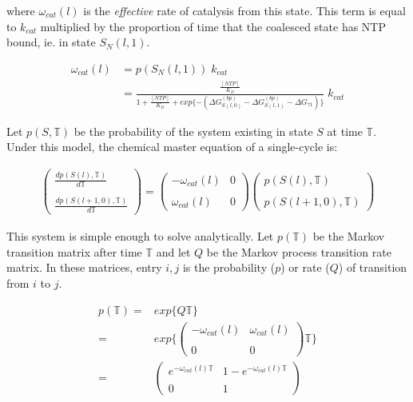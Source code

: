 \documentclass[10pt,letterpaper]{article}
\begin{document}
where $\omega_{cat}(l)$ is the \textit{effective} rate of catalysis from this state. This term is equal to $k_{cat}$ multiplied by the proportion of time that the coalesced state has NTP bound, ie. in state $S_N(l,1)$.


\begin{align}
    \omega_{cat}(l) &= p( S_N(l,1) ) \; k_{cat} \\
    &= \frac{ \frac{[NTP]}{K_D} }{ 1 + \frac{[NTP]}{K_D} + exp\{ -(\Delta G^{(bp)}_{S(l,0)} -  \Delta G^{(bp)}_{S(l,1)} - \Delta G _{\tau 1} ) \} } \; k_{cat}
\end{align}


Let $p(S, \mathbb{T})$ be the probability of the system existing in state $S$ at time $\mathbb{T}$. Under this model, the chemical master equation of a single-cycle is:


\begin{eqnarray}
    \begin{pmatrix}
        \frac{d p( S(l), \mathbb{T} )}{d\mathbb{T}} \\ \\
        \frac{d p( S(l+1,0), \mathbb{T} )}{d\mathbb{T}}
    \end{pmatrix} =
    \begin{pmatrix}
        -\omega_{cat}(l) & 0 \\ \\
        \omega_{cat}(l) & 0
    \end{pmatrix}
    \begin{pmatrix}
        p( S(l), \mathbb{T} ) \\ \\
        p( S(l+1,0), \mathbb{T} )
    \end{pmatrix}
\end{eqnarray}



This system is simple enough to solve analytically. Let $p(\mathbb{T})$ be the Markov transition matrix after time $\mathbb{T}$ and let $Q$ be the Markov process transition rate matrix. In these matrices, entry $i,j$ is the probability ($p$) or rate ($Q$) of transition from $i$ to $j$.


\begin{align}
    p(\mathbb{T}) =& exp\{ Q\mathbb{T} \} \\
    =& exp \Bigg\{
     \begin{pmatrix}
        -\omega_{cat}(l) & \omega_{cat}(l) \\ \\
        0 & 0
    \end{pmatrix} \mathbb{T}
    \Bigg\} \\
    =& \begin{pmatrix}
        e^{-\omega_{cat}(l) \mathbb{T}} & 1 - e^{-\omega_{cat}(l) \mathbb{T}} \\ \\
        0 & 1
    \end{pmatrix}
\end{align}
\end{document}
